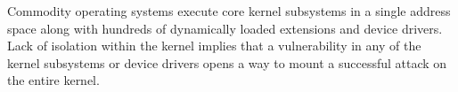   Commodity operating systems execute core kernel subsystems in a single address space along with hundreds of dynamically loaded extensions and device drivers. Lack of isolation within the kernel implies that a vulnerability in any of the kernel subsystems or device drivers opens a way to mount a successful attack on the entire kernel.